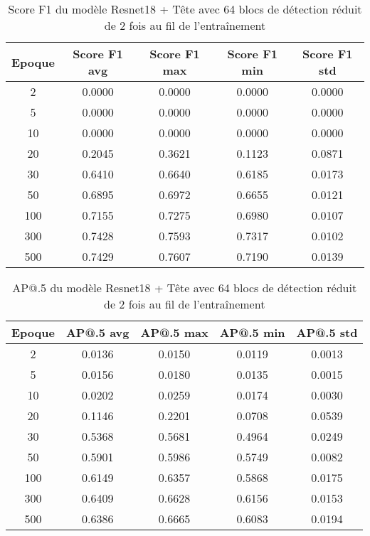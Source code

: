 \begin{table}[!ht]
    \caption{Score F1 du modèle Resnet18 + Tête avec 64 blocs de détection réduit de 2 fois au fil de l'entraînement}
    \label{tab:resnet18+head_64n_reduced_2x_f1score}
    \centering
    \begin{tabular}{ |c||c|c|c|c|  }
        \hline
        \rowcolor{gray!50}
        Epoque & Score F1 avg & Score F1 max & Score F1 min & Score F1 std\\
        \hline
        2 & 0.0000 & 0.0000 & 0.0000 & 0.0000\\
        5 & 0.0000 & 0.0000 & 0.0000 & 0.0000\\
        10 & 0.0000 & 0.0000 & 0.0000 & 0.0000\\
        20 & 0.2045 & 0.3621 & 0.1123 & 0.0871\\
        30 & 0.6410 & 0.6640 & 0.6185 & 0.0173\\
        50 & 0.6895 & 0.6972 & 0.6655 & 0.0121\\
        100 & 0.7155 & 0.7275 & 0.6980 & 0.0107\\
        300 & 0.7428 & 0.7593 & 0.7317 & 0.0102\\
        500 & 0.7429 & 0.7607 & 0.7190 & 0.0139\\
        \hline
    \end{tabular}
\end{table}

\begin{table}[!ht]
    \caption{AP@.5 du modèle Resnet18 + Tête avec 64 blocs de détection réduit de 2 fois au fil de l'entraînement}
    \label{tab:resnet18+head_64n_reduced_2x_ap50}
    \centering
    \begin{tabular}{ |c||c|c|c|c|  }
        \hline
        \rowcolor{gray!50}
        Epoque & AP@.5 avg & AP@.5 max & AP@.5 min & AP@.5 std\\
        \hline
        2 & 0.0136 & 0.0150 & 0.0119 & 0.0013\\
        5 & 0.0156 & 0.0180 & 0.0135 & 0.0015\\
        10 & 0.0202 & 0.0259 & 0.0174 & 0.0030\\
        20 & 0.1146 & 0.2201 & 0.0708 & 0.0539\\
        30 & 0.5368 & 0.5681 & 0.4964 & 0.0249\\
        50 & 0.5901 & 0.5986 & 0.5749 & 0.0082\\
        100 & 0.6149 & 0.6357 & 0.5868 & 0.0175\\
        300 & 0.6409 & 0.6628 & 0.6156 & 0.0153\\
        500 & 0.6386 & 0.6665 & 0.6083 & 0.0194\\
        \hline
    \end{tabular}
\end{table}

